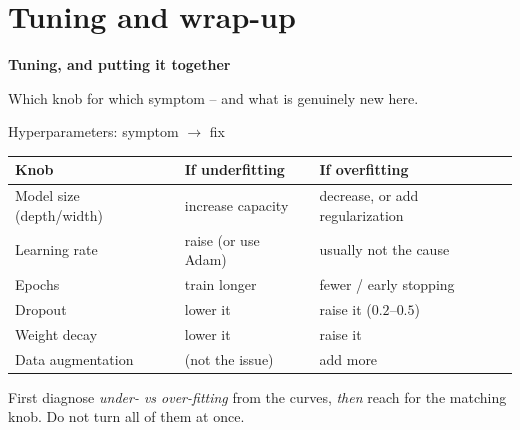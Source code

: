 \documentclass[aspectratio=169]{beamer}
\begin{document}
\section{Tuning and wrap-up}

\begin{frame}[plain]
  \vfill
  \begin{center}
    {\Large\color{popblue}\textbf{Tuning, and putting it together}}\\[0.9em]
    \begin{minipage}{0.82\textwidth}\centering\small
      Which knob for which symptom -- and what is genuinely new here.
    \end{minipage}
  \end{center}
  \vfill
\end{frame}

\begin{frame}{Hyperparameters: symptom $\to$ fix}
  \begin{center}\small
    \begin{tabular}{p{3.3cm} p{4.1cm} p{4.1cm}}
      \textbf{Knob} & \textbf{If underfitting} & \textbf{If overfitting} \\ \hline
      Model size (depth/width) & increase capacity & decrease, or add regularization \\[2pt]
      Learning rate & raise (or use Adam) & usually not the cause \\[2pt]
      Epochs & train longer & fewer / early stopping \\[2pt]
      Dropout & lower it & raise it ($0.2$--$0.5$) \\[2pt]
      Weight decay & lower it & raise it \\[2pt]
      Data augmentation & (not the issue) & add more \\
    \end{tabular}
  \end{center}
  \vfill
  \footnotesize First diagnose \emph{under- vs over-fitting} from the curves, \emph{then} reach
  for the matching knob. Do not turn all of them at once.
\end{frame}
\end{document}
